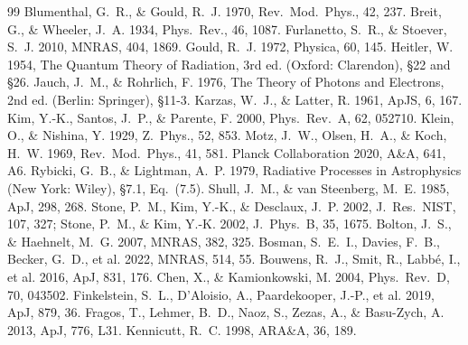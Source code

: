 \documentclass[11pt,a4paper]{article}
\begin{document}
\begin{thebibliography}{99}
  Blumenthal, G.~R., \& Gould, R.~J. 1970, Rev.\ Mod.\ Phys., 42, 237.
  Breit, G., \& Wheeler, J.~A. 1934, Phys.\ Rev., 46, 1087.
  Furlanetto, S.~R., \& Stoever, S.~J. 2010, MNRAS, 404, 1869.
  Gould, R.~J. 1972, Physica, 60, 145.
  Heitler, W. 1954, The Quantum Theory of Radiation, 3rd ed. (Oxford: Clarendon),
  \S22 and \S26.
  Jauch, J.~M., \& Rohrlich, F. 1976, The Theory of Photons and Electrons,
  2nd ed. (Berlin: Springer), \S11-3.
  Karzas, W.~J., \& Latter, R. 1961, ApJS, 6, 167.
  Kim, Y.-K., Santos, J.~P., \& Parente, F. 2000, Phys.\ Rev.\ A, 62, 052710.
  Klein, O., \& Nishina, Y. 1929, Z.\ Phys., 52, 853.
  Motz, J.~W., Olsen, H.~A., \& Koch, H.~W. 1969, Rev.\ Mod.\ Phys., 41, 581.
  Planck Collaboration 2020, A\&A, 641, A6.
  Rybicki, G.~B., \& Lightman, A.~P. 1979, Radiative Processes in Astrophysics
  (New York: Wiley), \S7.1, Eq.~(7.5).
  Shull, J.~M., \& van Steenberg, M.~E. 1985, ApJ, 298, 268.
  Stone, P.~M., Kim, Y.-K., \& Desclaux, J.~P. 2002, J.\ Res.\ NIST, 107, 327;
  Stone, P.~M., \& Kim, Y.-K. 2002, J.\ Phys.\ B, 35, 1675.
  Bolton, J.~S., \& Haehnelt, M.~G. 2007, MNRAS, 382, 325.
  Bosman, S.~E.~I., Davies, F.~B., Becker, G.~D., et al. 2022, MNRAS, 514, 55.
  Bouwens, R.~J., Smit, R., Labb\'e, I., et al. 2016, ApJ, 831, 176.
  Chen, X., \& Kamionkowski, M. 2004, Phys.\ Rev.\ D, 70, 043502.
  Finkelstein, S.~L., D'Aloisio, A., Paardekooper, J.-P., et al. 2019, ApJ, 879, 36.
  Fragos, T., Lehmer, B.~D., Naoz, S., Zezas, A., \& Basu-Zych, A. 2013,
  ApJ, 776, L31.
  Kennicutt, R.~C. 1998, ARA\&A, 36, 189.

\end{thebibliography}
\end{document}

